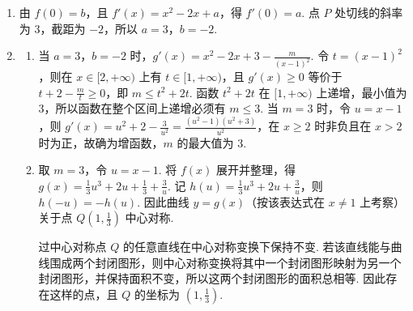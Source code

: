 \begin{solution}
\begin{enumerate}
\item 由 \(f(0)=b\)，且 \(f'(x)=x^2-2x+a\)，得 \(f'(0)=a\). 点 \(P\) 处切线的斜率为 \(3\)，截距为 \(-2\)，所以 \(a=3\)，\(b=-2\).
\item
\begin{enumerate}
\item 当 \(a=3\)，\(b=-2\) 时，\(g'(x)=x^2-2x+3-\frac{m}{(x-1)^2}\). 令 \(t=(x-1)^2\)，则在 \(x\in[2,+\infty)\) 上有 \(t\in[1,+\infty)\)，且 \(g'(x)\geqslant0\) 等价于 \(t+2-\frac{m}{t}\geqslant0\)，即 \(m\leqslant t^2+2t\). 函数 \(t^2+2t\) 在 \([1,+\infty)\) 上递增，最小值为 \(3\)，所以函数在整个区间上递增必须有 \(m\leqslant3\). 当 \(m=3\) 时，令 \(u=x-1\)，则 \(g'(x)=u^2+2-\frac{3}{u^2}=\frac{(u^2-1)(u^2+3)}{u^2}\)，在 \(x\geqslant2\) 时非负且在 \(x>2\) 时为正，故确为增函数，\(m\) 的最大值为 \(3\).
\item 取 \(m=3\)，令 \(u=x-1\). 将 \(f(x)\) 展开并整理，得 \(g(x)=\frac{1}{3}u^3+2u+\frac{1}{3}+\frac{3}{u}\). 记 \(h(u)=\frac{1}{3}u^3+2u+\frac{3}{u}\)，则 \(h(-u)=-h(u)\). 因此曲线 \(y=g(x)\)（按该表达式在 \(x\ne1\) 上考察）关于点 \(Q\left(1,\frac{1}{3}\right)\) 中心对称.

过中心对称点 \(Q\) 的任意直线在中心对称变换下保持不变. 若该直线能与曲线围成两个封闭图形，则中心对称变换将其中一个封闭图形映射为另一个封闭图形，并保持面积不变，所以这两个封闭图形的面积总相等. 因此存在这样的点，且 \(Q\) 的坐标为 \(\left(1,\frac{1}{3}\right)\).
\end{enumerate}
\end{enumerate}
\end{solution}
